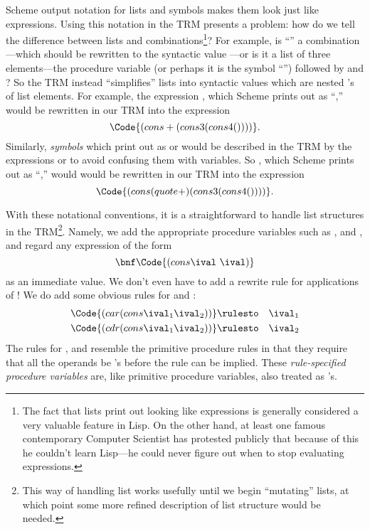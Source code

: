 \documentclass[11pt]{article}
\begin{document}
Scheme output notation for lists and symbols makes them look just like
expressions.  Using this notation in the TRM presents a problem: how do we
tell the difference between lists and combinations\footnote{The fact that
lists print out looking like expressions is generally considered a very
valuable feature in Lisp.  On the other hand, at least one famous
contemporary Computer Scientist has protested publicly that because of
this he couldn't learn Lisp---he could never figure out when to stop
evaluating expressions.}?  For example, is ``'' a
combination---which should be rewritten to the syntactic value
---or is it a list of three elements---the procedure variable
\Code{+} (or perhaps it is the symbol ``\Code{+}'') followed by 
and ?  So the TRM instead ``simplifies'' lists into syntactic
values which are nested 's of list elements.  For example, the
expression , which Scheme prints out as
``,'' would be rewritten in
our TRM into the expression
\[\Code{(cons + (cons 3 (cons 4 ())))}.\]
Similarly, {\em symbols\/} which print out as  or \Code{+}
would be described in the TRM by the expressions  or
 to avoid confusing them with variables.  So
, which Scheme prints out as ``,''
would would be rewritten in our TRM into the expression
\[\Code{(cons (quote +) (cons 3 (cons 4 ())))}.\]

With these notational conventions, it is a straightforward to handle
list structures in the TRM\footnote{This way of handling list works
  usefully until we begin ``mutating'' lists, at which point some more
  refined description of list structure would be needed.}.  Namely, we
add the appropriate procedure variables such as ,
 and , and regard any expression of the form
\[\bnf\Code{(cons \ival\ \ival)}\]
as an immediate value.  We don't even have to add a rewrite rule for
applications of !  We do add some obvious rules for 
and :
\begin{eqnarray*}
\Code{(car (cons \ival_{1} \ival_{2}))}
& \rulesto & \ival_{1} \\
\Code{(cdr (cons \ival_{1} \ival_{2}))}
& \rulesto & \ival_{2} \\
\end{eqnarray*}
The rules for ,  and  resemble the
primitive procedure rules in that they require that all the operands be
\ival's before the rule can be implied.  These {\em rule-specified
procedure variables} are, like primitive procedure variables, also treated
as \ival's.
\end{document}
